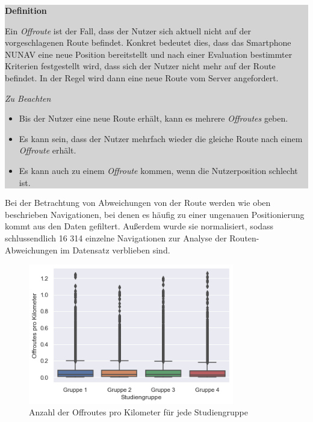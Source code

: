 \noindent\colorbox{lightgray}{%
    \parbox{0.975\linewidth}{
        \textbf{Definition}

        Ein \textit{Offroute} ist der Fall, dass der Nutzer sich aktuell nicht auf der vorgeschlagenen Route befindet. Konkret bedeutet dies, dass das Smartphone NUNAV eine neue Position bereitstellt und nach einer Evaluation bestimmter Kriterien festgestellt wird, dass sich der Nutzer nicht mehr auf der Route befindet. In der Regel wird dann eine neue Route vom Server angefordert.
        
        \textit{Zu Beachten}
        \begin{itemize}
            \item Bis der Nutzer eine neue Route erhält, kann es mehrere \textit{Offroutes} geben.
            \item Es kann sein, dass der Nutzer mehrfach wieder die gleiche Route nach einem \textit{Offroute} erhält.
            \item Es kann auch zu einem \textit{Offroute} kommen, wenn die Nutzerposition schlecht ist.
        \end{itemize}
    }
}

\smallskip

Bei der Betrachtung von Abweichungen von der Route werden wie oben beschrieben Navigationen, bei denen es häufig zu einer ungenauen Positionierung kommt aus den Daten gefiltert. Außerdem wurde sie normalisiert, sodass schlussendlich 16 314 einzelne Navigationen zur Analyse der Routen-Abweichungen im Datensatz verblieben sind.

\begin{figure}
    \includegraphics[width=0.8\textwidth]{contents/06_model_evaluation/res/OffRoute_Result_Overview.png}
    \caption{Anzahl der Offroutes pro Kilometer für jede Studiengruppe}
\end{figure}

